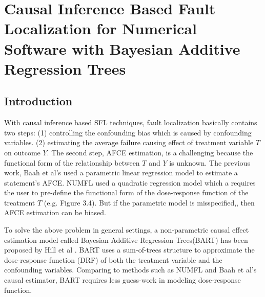 \chapter{Causal Inference Based Fault Localization for Numerical Software with Bayesian Additive Regression Trees}\label{chap:BART}


\section{Introduction}\label{BARTintro}
\vspace{-2pt}
With causal inference based SFL techniques\cite{bai2015numfl, baah2010causal, baah2011mitigating,shu2013mfl}, fault localization basically contains two steps: (1) controlling the confounding bias which is caused by confounding variables. (2) estimating the average failure causing effect of treatment variable $T$ on outcome $Y$. The second step, AFCE estimation, is a challenging because the functional form of the relationship between $T$ and $Y$ is unknown. The previous work, Baah et al’s used a parametric linear regression model to estimate a statement's AFCE. NUMFL used a quadratic regression model which a requires the user to pre-define the functional form of the dose-response function of the treatment $T$ (e.g. Figure 3.4). But if the parametric model is misspecified,, then AFCE estimation can be biased.

To solve the above problem in general settings, a non-parametric causal effect estimation model called Bayesian Additive Regression Trees(BART) has been proposed by Hill et al \cite{hill2012bayesian}. BART uses a sum-of-trees structure to approximate the dose-response function (DRF) of both the treatment variable and the confounding variables. 
Comparing to methods such as NUMFL and Baah et al’s causal estimator, BART requires less guess-work in modeling dose-response function.   

